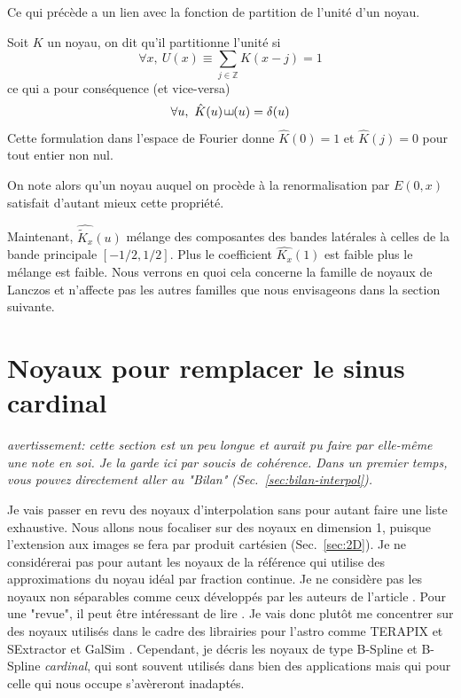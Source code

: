 \documentclass[11pt,twoside]{article}
\DeclareMathOperator{\comb}{\raisebox{\depth}{\rotatebox{270}{$\exists$}}}
\begin{document}
Ce qui précède a un lien avec la fonction de partition de l'unité d'un noyau.
\begin{propriete}\label{prop:unite}
Soit $K$ un noyau, on dit  qu'il partitionne l'unité si
\begin{equation}
\forall x,\ U(x)\equiv \sum_{j\in\mathbb{Z}} K(x-j) = 1 
\end{equation} 
ce qui a pour conséquence (et vice-versa)
\begin{equation}
\forall u,\ \hat{K}(u) \comb(u)=\delta(u)
\end{equation}
Cette formulation dans l'espace de Fourier donne $\hat{K}(0)=1$ et $\hat{K}(j)=0$ pour tout entier non nul.
\end{propriete} 
On note alors qu'un noyau auquel on procède à la renormalisation par $E(0,x)$ satisfait d'autant mieux cette propriété.
 

Maintenant,  $\widehat{\tilde{K}_x}(u)$ mélange des composantes des  bandes latérales à celles de la bande principale $[-1/2,1/2]$. Plus le coefficient $\hat{K_x}(1)$ est faible plus le mélange est faible. Nous verrons en quoi cela concerne la famille de noyaux de Lanczos et n'affecte pas les autres familles que nous envisageons dans la section suivante.
%
\section{Noyaux pour remplacer le sinus cardinal}
%

\textit{avertissement: cette section est un peu longue et aurait pu faire par elle-même une note en soi. Je la garde ici par soucis de cohérence. Dans un premier temps, vous pouvez directement aller au "Bilan" (Sec.~\ref{sec:bilan-interpol}).  
}

Je vais passer en revu des noyaux d'interpolation sans pour autant faire une liste exhaustive. Nous allons nous focaliser sur des noyaux en dimension 1, puisque l'extension aux images se fera par produit cartésien (Sec.~\ref{sec:2D}). Je ne considérerai pas pour autant les noyaux de la référence \citep{HU200646} qui utilise des approximations du noyau idéal par fraction continue. Je ne considère pas les noyaux non séparables comme ceux développés par les auteurs de l'article \citep{Shi2006ImageIB}. Pour une "revue", il peut être intéressant de lire \cite{Parsania2016}. Je vais donc plutôt me concentrer sur des noyaux utilisés dans le cadre des librairies pour l'astro comme \textsf{TERAPIX}  et \textsf{SExtractor} \citep{2011ASPC..442..435B} et \textsf{GalSim} \citep{2015A&C....10..121R}. Cependant, je décris les noyaux de type B-Spline et B-Spline \textit{cardinal}, qui sont souvent utilisés dans bien des applications mais qui pour celle qui nous occupe s'avèreront inadaptés.
%
\end{document}
